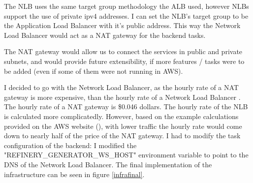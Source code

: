 		The NLB uses the same target group methodology the
		ALB used, however NLBs support the use of private ipv4 addresses. I can set the NLB's target group to be the Application Load Balancer 
		with it's public address. This way the Network Load Balancer would act as a NAT gateway for the backend tasks.

		The NAT gateway would allow us to connect the services in public and private subnets, and would provide future extensibility, if more 
		features / tasks were to be added (even if some of them were not running in AWS).

		I decided to go with the Network Load Balancer, as the hourly rate of a NAT gateway is more expensive, than the hourly rate of a 
		Network Load Balancer \cite{natprice} \cite{nlbprice}. The hourly rate of a NAT gateway is \$0.046 dollars. The hourly rate of 
		the NLB is calculated more complicatedly. However, based on the example calculations provided on the AWS website (\cite{nlbprice}),
		with lower traffic the hourly rate would come down to nearly half of the price of the NAT gateway. I had to modify the task 
		configuration of the backend: I modified the "REFINERY\_GENERATOR\_WS\_HOST" environment variable to point to the DNS of the 
		Network Load Balancer. The final implementation of the infrastructure can be seen in figure \ref{infrafinal}.
